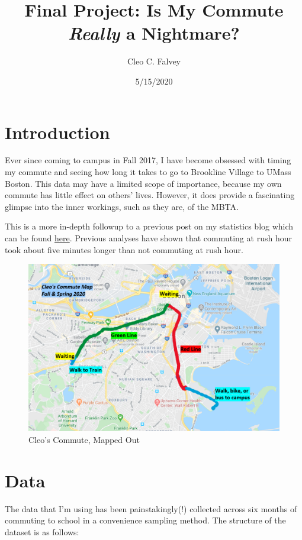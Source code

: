 \documentclass[
]{article}
\title{Final Project: Is My Commute \emph{Really} a Nightmare?}
\author{Cleo C. Falvey}
\date{5/15/2020}
\begin{document}
\maketitle

\hypertarget{introduction}{%
\section{Introduction}\label{introduction}}

Ever since coming to campus in Fall 2017, I have become obsessed with
timing my commute and seeing how long it takes to go to Brookline
Village to UMass Boston. This data may have a limited scope of
importance, because my own commute has little effect on others' lives.
However, it does provide a fascinating glimpse into the inner workings,
such as they are, of the MBTA.

This is a more in-depth followup to a previous post on my statistics
blog which can be found
\href{https://graphmyundergrad.rbind.io/2019/06/27/tracking-my-nightmarish-commute/}{here}.
Previous analyses have shown that commuting at rush hour took about five
minutes longer than not commuting at rush hour.

\begin{figure}
\includegraphics[width=1\linewidth]{commute_map} \caption{Cleo's Commute, Mapped Out}\label{fig:unnamed-chunk-2}
\end{figure}

\hypertarget{data}{%
\section{Data}\label{data}}

The data that I'm using has been painstakingly(!) collected across six
months of commuting to school in a convenience sampling method. The
structure of the dataset is as follows:
\end{document}
